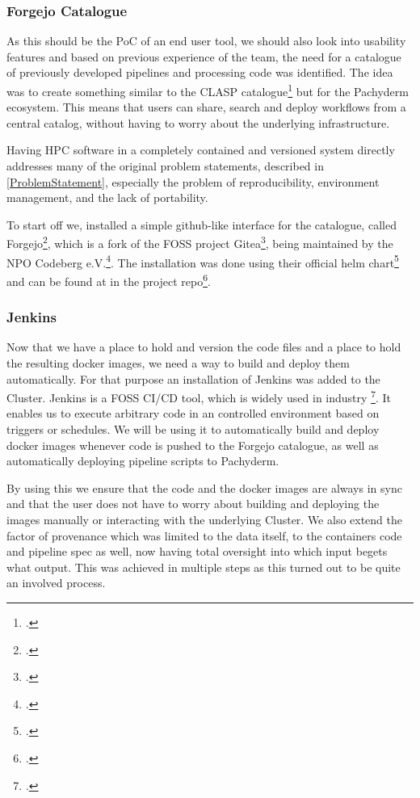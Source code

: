 \subsubsection{Forgejo Catalogue}

As this should be the \ac{PoC} of an end user tool, we should also look into usability features and based on previous experience of the team,
the need for a catalogue of previously developed pipelines and processing code was identified.
The idea was to create something similar to the \ac{CLASP} catalogue\footcite{sayersCLoudApplicationServices2015} but for the Pachyderm ecosystem.
This means that users can share, search and deploy workflows from a central catalog, without having to worry about the underlying infrastructure.

Having \ac{HPC} software in a completely contained and versioned system directly addresses many of the original problem statements,
described in \ref{ProblemStatement}, especially the problem of reproducibility, environment management, and the lack of portability.

To start off we, installed a simple github-like interface for the catalogue, called Forgejo\footcite{forgejoForgejo}, which is a fork of the \ac{FOSS} project Gitea\footcite{GiteaGitCup2023},
being maintained by the \ac{NPO} Codeberg e.V.\footcite{codebergCodebergOrg}.
The installation was done using their official helm chart\footcite{Forgejo13Forgejo} and can be found at in the project repo\footcite{Forgejo config}.

\subsubsection{Jenkins}

Now that we have a place to hold and version the code files and a place to hold the resulting docker images, we need a way to build and deploy them automatically.
For that purpose an installation of Jenkins was added to the Cluster. Jenkins is a \ac{FOSS} \ac{CI/CD} tool, which is widely used in industry \footcite{JenkinsMarketShare}.
It enables us to execute arbitrary code in an controlled environment based on triggers or schedules.
We will be using it to automatically build and deploy docker images whenever code is pushed to the Forgejo catalogue, as well as automatically deploying pipeline scripts to Pachyderm.

By using this we ensure that the code and the docker images are always in sync and that the user does not have to worry about building and deploying the images manually or interacting with the underlying Cluster.
We also extend the factor of provenance which was limited to the data itself, to the containers code and pipeline spec as well, now having total oversight into which input begets what output.
This was achieved in multiple steps as this turned out to be quite an involved process.

